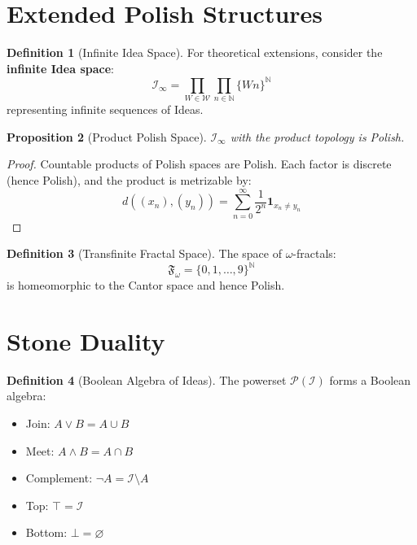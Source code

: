 \documentclass[11pt,twoside,openright]{book}
\theoremstyle{definition}
\newtheorem{definition}{Definition}[chapter]
\theoremstyle{plain}
\newtheorem{proposition}[definition]{Proposition}
\theoremstyle{remark}
\newcommand{\Worlds}{\mathcal{W}}
\newcommand{\Ideas}{\mathcal{I}}
\newcommand{\FracSet}{\mathfrak{F}}
\begin{document}
\section{Extended Polish Structures}

\begin{definition}[Infinite Idea Space]
\label{def:infinite-idea}
For theoretical extensions, consider the \textbf{infinite Idea space}:
\[
\Ideas_\infty = \prod_{W \in \Worlds} \prod_{n \in \mathbb{N}} \{Wn\}^\mathbb{N}
\]
representing infinite sequences of Ideas.
\end{definition}

\begin{proposition}[Product Polish Space]
\label{prop:product-polish}
$\Ideas_\infty$ with the product topology is Polish.
\end{proposition}

\begin{proof}
Countable products of Polish spaces are Polish. Each factor is discrete (hence Polish), and the product is metrizable by:
\[
d((x_n), (y_n)) = \sum_{n=0}^\infty \frac{1}{2^n} \mathbf{1}_{x_n \neq y_n}
\]
\end{proof}

\begin{definition}[Transfinite Fractal Space]
\label{def:fractal-polish}
The space of $\omega$-fractals:
\[
\FracSet_\omega = \{0, 1, \ldots, 9\}^\mathbb{N}
\]
is homeomorphic to the Cantor space and hence Polish.
\end{definition}

\section{Stone Duality}

\begin{definition}[Boolean Algebra of Ideas]
\label{def:boolean-ideas}
The powerset $\mathcal{P}(\Ideas)$ forms a Boolean algebra:
\begin{itemize}
  \item Join: $A \vee B = A \cup B$
  \item Meet: $A \wedge B = A \cap B$
  \item Complement: $\neg A = \Ideas \setminus A$
  \item Top: $\top = \Ideas$
  \item Bottom: $\bot = \varnothing$
\end{itemize}
\end{definition}
\end{document}
